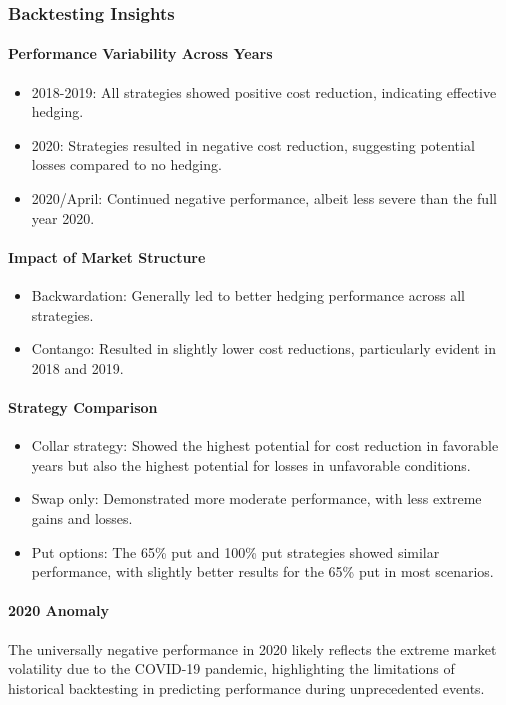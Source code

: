 \documentclass[12pt]{article}
\begin{document}
\subsubsection{Backtesting Insights}

\paragraph{Performance Variability Across Years}
\begin{itemize}
    \item 2018-2019: All strategies showed positive cost reduction, indicating effective hedging.
    \item 2020: Strategies resulted in negative cost reduction, suggesting potential losses compared to no hedging.
    \item 2020/April: Continued negative performance, albeit less severe than the full year 2020.
\end{itemize}

\paragraph{Impact of Market Structure}
\begin{itemize}
    \item Backwardation: Generally led to better hedging performance across all strategies.
    \item Contango: Resulted in slightly lower cost reductions, particularly evident in 2018 and 2019.
\end{itemize}

\paragraph{Strategy Comparison}
\begin{itemize}
    \item Collar strategy: Showed the highest potential for cost reduction in favorable years but also the highest potential for losses in unfavorable conditions.
    \item Swap only: Demonstrated more moderate performance, with less extreme gains and losses.
    \item Put options: The 65\% put and 100\% put strategies showed similar performance, with slightly better results for the 65\% put in most scenarios.
\end{itemize}

\paragraph{2020 Anomaly}
The universally negative performance in 2020 likely reflects the extreme market volatility due to the COVID-19 pandemic, highlighting the limitations of historical backtesting in predicting performance during unprecedented events.
\end{document}
